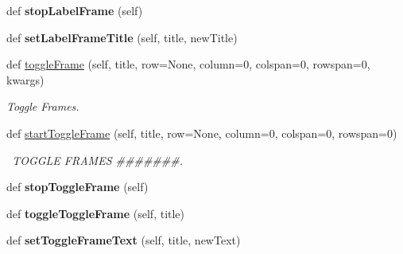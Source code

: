 \begin{DoxyCompactItemize}
\item 
\mbox{\label{class_python_01_g_u_i_1_1appjar_1_1gui_ad8af3b122dfe535d0f1f17d9a3936dbc}} 
def {\bfseries stop\+Label\+Frame} (self)
\item 
\mbox{\label{class_python_01_g_u_i_1_1appjar_1_1gui_a291c8e1ccab55c9d13ba4d3666e2510d}} 
def {\bfseries set\+Label\+Frame\+Title} (self, title, new\+Title)
\item 
\mbox{\label{class_python_01_g_u_i_1_1appjar_1_1gui_ad6cd09d134cc935d21964677b0204d09}} 
def \hyperlink{class_python_01_g_u_i_1_1appjar_1_1gui_ad6cd09d134cc935d21964677b0204d09}{toggle\+Frame} (self, title, row=None, column=0, colspan=0, rowspan=0, kwargs)
\begin{DoxyCompactList}\small\item\em Toggle Frames. \end{DoxyCompactList}\item 
\mbox{\label{class_python_01_g_u_i_1_1appjar_1_1gui_aba80e5a89ab8e5f327de1970ce73ec84}} 
def \hyperlink{class_python_01_g_u_i_1_1appjar_1_1gui_aba80e5a89ab8e5f327de1970ce73ec84}{start\+Toggle\+Frame} (self, title, row=None, column=0, colspan=0, rowspan=0)
\begin{DoxyCompactList}\small\item\em  \+T\+O\+G\+G\+LE F\+R\+A\+M\+ES \#\#\#\#\#\#\#. \end{DoxyCompactList}\item 
\mbox{\label{class_python_01_g_u_i_1_1appjar_1_1gui_a73b21698e1ff93f93c1f14ab9c631d5e}} 
def {\bfseries stop\+Toggle\+Frame} (self)
\item 
\mbox{\label{class_python_01_g_u_i_1_1appjar_1_1gui_a47829880ccccd91e47ec5d65c73dab70}} 
def {\bfseries toggle\+Toggle\+Frame} (self, title)
\item 
\mbox{\label{class_python_01_g_u_i_1_1appjar_1_1gui_a5b0f4ecb7e32dcd332c955486aedf0fe}} 
def {\bfseries set\+Toggle\+Frame\+Text} (self, title, new\+Text)
\item 

\end{DoxyCompactItemize}
